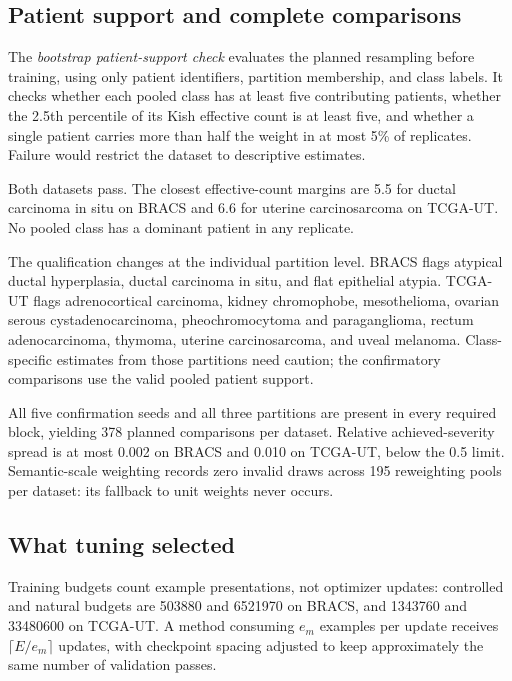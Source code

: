 \subsection{Patient support and complete comparisons}
\label{app:realized-validity}
The \emph{bootstrap patient-support check} evaluates the planned resampling before training, using only patient identifiers, partition membership, and class labels. It checks whether each pooled class has at least five contributing patients, whether the \num{2.5}th percentile of its Kish effective count is at least five, and whether a single patient carries more than half the weight in at most \num{5}\% of replicates. Failure would restrict the dataset to descriptive estimates.

Both datasets pass. The closest effective-count margins are \num{5.5} for ductal carcinoma in situ on BRACS and \num{6.6} for uterine carcinosarcoma on TCGA-UT. No pooled class has a dominant patient in any replicate.

The qualification changes at the individual partition level. BRACS flags atypical ductal hyperplasia, ductal carcinoma in situ, and flat epithelial atypia. TCGA-UT flags adrenocortical carcinoma, kidney chromophobe, mesothelioma, ovarian serous cystadenocarcinoma, pheochromocytoma and paraganglioma, rectum adenocarcinoma, thymoma, uterine carcinosarcoma, and uveal melanoma. Class-specific estimates from those partitions need caution; the confirmatory comparisons use the valid pooled patient support.

All five confirmation seeds and all three partitions are present in every required block, yielding \num{378} planned comparisons per dataset. Relative achieved-severity spread is at most \num{0.002} on BRACS and \num{0.010} on TCGA-UT, below the \num{0.5} limit. Semantic-scale weighting records zero invalid draws across \num{195} reweighting pools per dataset: its fallback to unit weights never occurs.

\subsection{What tuning selected}
\label{app:realized-deviations}
Training budgets count example presentations, not optimizer updates: controlled and natural budgets are \num{503880} and \num{6521970} on BRACS, and \num{1343760} and \num{33480600} on TCGA-UT. A method consuming $e_m$ examples per update receives $\lceil E/e_m\rceil$ updates, with checkpoint spacing adjusted to keep approximately the same number of validation passes.

